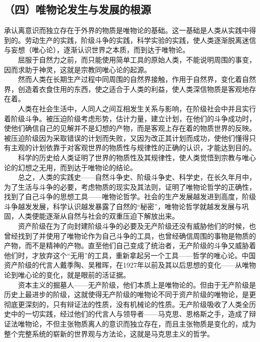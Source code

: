 \documentclass[cn,11pt,chinese]{elegantbook}
\def\myformat#1{\hfil\hfil #1}
\begin{document}
\subsection*{\myformat{（四）唯物论发生与发展的根源}}
承认离意识而独立存在于外界的物质是唯物论的基础。这一基础是人类从实践中得到的。劳动生产的实践，阶级斗争的实践，科学实验的实践，使人类逐渐脱离迷信与妄想（唯心论），逐渐认识世界之本质，而到达于唯物论。\\
　　屈服于自然力之前，而只能使用简单工具的原始人类，不能说明周围的事变，因而求助于神灵，这就是宗教同唯心论的起源。\\
　　然而人类在长期生产过程中同周围的自然界接触，作用于自然界，变化着自然界，创造着衣食住用的东西，使之适合于人类的利益，使人类深信物质是客观地存在着。\\
　　人类在社会生活中，人同人之间互相发生关系与影响，在阶级社会中并且实行着阶级斗争。被压迫阶级考虑形势，估计力量，建立计划，在他们的斗争成功时，使他们确信自己的见解并不是幻想的产物，而是客观上存在着的物质世界的反映。被压迫阶级因为采取错误的计划而失败，又因为改正其计划而成功，使他们懂得只有主观的计划依靠于对客观世界的物质性与规律性的正确的认识，才能达到目的。\\
　　科学的历史给人类证明了世界的物质性及其规律性，使人类觉悟到宗教与唯心论的幻想之无用，而到达于唯物论的结论。\\
　　总之，人类的实践史——自然斗争史、阶级斗争史、科学史，在长久年月中，为了生活与斗争的必要，考虑物质的现实及其法则，证明了唯物论哲学的正确性，找到了自己斗争的思想工具——唯物论哲学。社会的生产发展越发进到高度，阶级斗争越发发展，科学认识越发暴露了自然的“秘密”，唯物论哲学就越发发展与巩固，人类便能逐渐从自然与社会的双重压迫下解放出来。\\
　　资产阶级在为了向封建阶级斗争的必要及无产阶级还没有威胁他们的时候，也曾经找到了并使用了唯物论作为自己斗争的工具，也曾经确信周围的事物是物质的产物，而不是精神的产物。直至他们自己变成了统治者，无产阶级的斗争又威胁着他们时，才放弃这个“无用”的工具，重新拿起另一个工具——哲学的唯心论。中国资产阶级的代言人戴季陶、吴稚晖，在1927年以前及其以后思想的变化——从唯物论到唯心论的变化，就是眼前的活证据。\\
　　资本主义的掘墓人——无产阶级，他们本质上是唯物论的。但由于无产阶级是历史上最进步的阶级，这就使得无产阶级的唯物论不同于资产阶级的唯物论，是更彻底更深刻的，只有辩证法的性质，没有机械论的性质。无产阶级吸收了人类全历史中的一切实践，经过他们的代言人与领导者——马克思、恩格斯之手，造成了辩证法唯物论，不但主张物质离人的意识而独立存在，而且主张物质是变化的，成为整个完整系统的崭新的世界观与方法论，这就是马克思主义的哲学。\\
\end{document}
